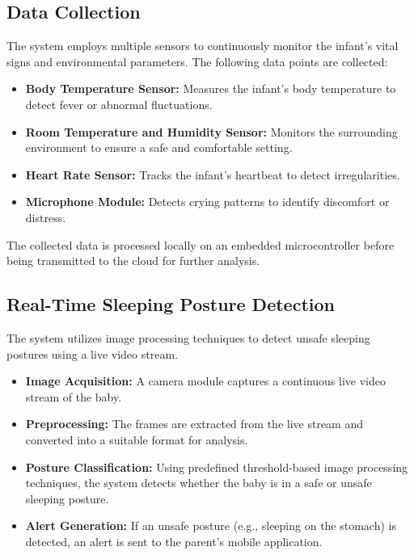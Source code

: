 \documentclass[conference]{IEEEtran}
\begin{document}
\subsection{Data Collection}
The system employs multiple sensors to continuously monitor the infant’s vital signs and environmental parameters. The following data points are collected:
\begin{itemize}
    \item \textbf{Body Temperature Sensor:} Measures the infant’s body temperature to detect fever or abnormal fluctuations.
    \item \textbf{Room Temperature and Humidity Sensor:} Monitors the surrounding environment to ensure a safe and comfortable setting.
    \item \textbf{Heart Rate Sensor:} Tracks the infant’s heartbeat to detect irregularities.
    \item \textbf{Microphone Module:} Detects crying patterns to identify discomfort or distress.
\end{itemize}
The collected data is processed locally on an embedded microcontroller before being transmitted to the cloud for further analysis.

\subsection{Real-Time Sleeping Posture Detection}
The system utilizes image processing techniques to detect unsafe sleeping postures using a live video stream. 
\begin{itemize}
    \item \textbf{Image Acquisition:} A camera module captures a continuous live video stream of the baby.
    \item \textbf{Preprocessing:} The frames are extracted from the live stream and converted into a suitable format for analysis.
    \item \textbf{Posture Classification:} Using predefined threshold-based image processing techniques, the system detects whether the baby is in a safe or unsafe sleeping posture.
    \item \textbf{Alert Generation:} If an unsafe posture (e.g., sleeping on the stomach) is detected, an alert is sent to the parent’s mobile application.
\end{itemize}
\end{document}

